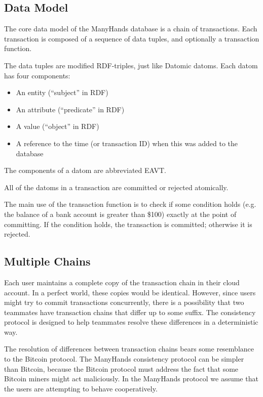 \documentclass[pldi-cameraready,10pt]{sigplanconf-pldi16}
\begin{document}
\subsection{Data Model}

The core data model of the ManyHands database is a chain of transactions.
Each transaction is composed of a sequence of data tuples, and optionally a transaction function.

The data tuples are modified RDF-triples, just like Datomic datoms.
Each datom has four components:

\begin{itemize}
\item An entity (``subject'' in RDF)
\item An attribute (``predicate'' in RDF)
\item A value (``object'' in RDF)
\item A reference to the time (or transaction ID) when this was added to the database
\end{itemize}

The components of a datom are abbreviated EAVT.

All of the datoms in a transaction are committed or rejected atomically.

The main use of the transaction function is to check if some condition holds (e.g. the balance of a bank account is greater than \$100) exactly at the point of committing.
If the condition holds, the transaction is committed; otherwise it is rejected.

\subsection{Multiple Chains}

Each user maintains a complete copy of the transaction chain in their cloud account.
In a perfect world, these copies would be identical.
However, since users might try to commit transactions concurrently, there is a possibility that two teammates have transaction chains that differ up to some suffix.
The consistency protocol is designed to help teammates resolve these differences in a deterministic way.

The resolution of differences between transaction chains bears some resemblance to the Bitcoin protocol.
The ManyHands consistency protocol can be simpler than Bitcoin, because the Bitcoin protocol must address the fact that some Bitcoin miners might act maliciously.
In the ManyHands protocol we assume that the users are attempting to behave cooperatively.
\end{document}
